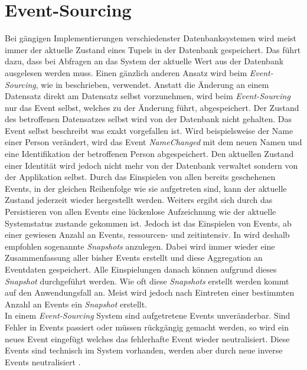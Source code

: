 \section{Event-Sourcing}
\label{sec:eventSourcing}
Bei gängigen Implementierungen verschiedenster Datenbanksystemen wird meist immer der aktuelle Zustand eines Tupels in der Datenbank gespeichert. Das führt dazu, dass bei Abfragen an das System der aktuelle Wert aus der Datenbank ausgelesen werden muss. Einen gänzlich anderen Ansatz wird beim \textit{Event-Sourcing}, wie in \cite{vernon2013implementing} beschrieben, verwendet. Anstatt die Änderung an einem Datensatz direkt am Datensatz selbst vorzunehmen, wird beim \textit{Event-Sourcing} nur das Event selbst, welches zu der Änderung führt, abgespeichert. Der Zustand des betroffenen Datensatzes selbst wird von der Datenbank nicht gehalten. Das Event selbst beschreibt was exakt vorgefallen ist. Wird beispielsweise der Name einer Person verändert, wird das Event \textit{NameChanged} mit dem neuen Namen und eine Identifikation der betroffenen Person abgespeichert. Den aktuellen Zustand einer Identität wird jedoch nicht mehr von der Datenbank verwaltet sondern von der Applikation selbst. Durch das Einspielen von allen bereits geschehenen Events, in der gleichen Reihenfolge wie sie aufgetreten sind, kann der aktuelle Zustand jederzeit wieder hergestellt werden. Weiters ergibt sich durch das Persistieren von allen Events eine lückenlose Aufzeichnung wie der aktuelle Systemstatus zustande gekommen ist. 
Jedoch ist das Einspielen von Events, ab einer gewiesen Anzahl an Events, ressourcen- und zeitintensiv. In \cite{vernon2013implementing} wird deshalb empfohlen sogenannte \textit{Snapshots} anzulegen. Dabei wird immer wieder eine Zusammenfassung aller bisher Events erstellt und diese Aggregation an Eventdaten gespeichert. Alle Einspielungen danach können aufgrund dieses \textit{Snapshot} durchgeführt werden. Wie oft diese \textit{Snapshots} erstellt werden kommt auf den Anwendungsfall an. Meist wird jedoch nach Eintreten einer bestimmten Anzahl an Events ein \textit{Snapshot} erstellt. \\
In einem \textit{Event-Sourcing} System sind aufgetretene Events unveränderbar. Sind Fehler in Events passiert oder müssen rückgängig gemacht werden, so wird ein neues Event eingefügt welches das fehlerhafte Event wieder neutralisiert. Diese Events sind technisch im System vorhanden, werden aber durch neue inverse Events neutralisiert \citep{vernon2013implementing}.
